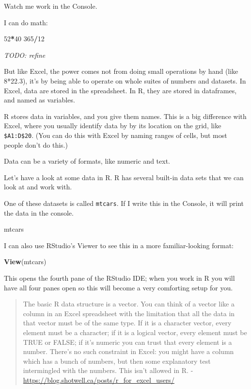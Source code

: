 \documentclass[]{book}
\newenvironment{Shaded}{\begin{snugshade}}{\end{snugshade}}
\newcommand{\DecValTok}[1]{\textcolor[rgb]{0.00,0.00,0.81}{#1}}
\newcommand{\KeywordTok}[1]{\textcolor[rgb]{0.13,0.29,0.53}{\textbf{#1}}}
\newcommand{\NormalTok}[1]{#1}
\newcommand{\OperatorTok}[1]{\textcolor[rgb]{0.81,0.36,0.00}{\textbf{#1}}}
\begin{document}
Watch me work in the Console.

I can do math:

\begin{Shaded}
\begin{Highlighting}[]
\DecValTok{52}\OperatorTok{*}\DecValTok{40}
\DecValTok{365}\OperatorTok{/}\DecValTok{12}
\end{Highlighting}
\end{Shaded}

\emph{TODO: refine}

But like Excel, the power comes not from doing small operations by hand (like 8*22.3), it's by being able to operate on whole suites of numbers and datasets. In Excel, data are stored in the spreadsheet. In R, they are stored in dataframes, and named as variables.

R stores data in variables, and you give them names. This is a big difference with Excel, where you usually identify data by by its location on the grid, like \texttt{\$A1:D\$20}. (You can do this with Excel by naming ranges of cells, but most people don't do this.)

Data can be a variety of formats, like numeric and text.

Let's have a look at some data in R. R has several built-in data sets that we can look at and work with.

One of these datasets is called \texttt{mtcars}. If I write this in the Console, it will print the data in the console.

\begin{Shaded}
\begin{Highlighting}[]
\NormalTok{mtcars}
\end{Highlighting}
\end{Shaded}

I can also use RStudio's Viewer to see this in a more familiar-looking format:

\begin{Shaded}
\begin{Highlighting}[]
\KeywordTok{View}\NormalTok{(mtcars)}
\end{Highlighting}
\end{Shaded}

This opens the fourth pane of the RStudio IDE; when you work in R you will have all four panes open so this will become a very comforting setup for you.

\begin{quote}
The basic R data structure is a vector. You can think of a vector like a column in an Excel spreadsheet with the limitation that all the data in that vector must be of the same type. If it is a character vector, every element must be a character; if it is a logical vector, every element must be TRUE or FALSE; if it's numeric you can trust that every element is a number. There's no such constraint in Excel: you might have a column which has a bunch of numbers, but then some explanatory test intermingled with the numbers. This isn't allowed in R. - \url{https://blog.shotwell.ca/posts/r_for_excel_users/}
\end{quote}
\end{document}

